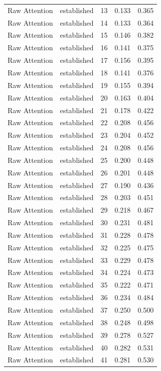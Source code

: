 \begin{tabular}{llrrr}
Raw Attention & established & 13 & 0.133 & 0.365 \\
Raw Attention & established & 14 & 0.133 & 0.364 \\
Raw Attention & established & 15 & 0.146 & 0.382 \\
Raw Attention & established & 16 & 0.141 & 0.375 \\
Raw Attention & established & 17 & 0.156 & 0.395 \\
Raw Attention & established & 18 & 0.141 & 0.376 \\
Raw Attention & established & 19 & 0.155 & 0.394 \\
Raw Attention & established & 20 & 0.163 & 0.404 \\
Raw Attention & established & 21 & 0.178 & 0.422 \\
Raw Attention & established & 22 & 0.208 & 0.456 \\
Raw Attention & established & 23 & 0.204 & 0.452 \\
Raw Attention & established & 24 & 0.208 & 0.456 \\
Raw Attention & established & 25 & 0.200 & 0.448 \\
Raw Attention & established & 26 & 0.201 & 0.448 \\
Raw Attention & established & 27 & 0.190 & 0.436 \\
Raw Attention & established & 28 & 0.203 & 0.451 \\
Raw Attention & established & 29 & 0.218 & 0.467 \\
Raw Attention & established & 30 & 0.231 & 0.481 \\
Raw Attention & established & 31 & 0.228 & 0.478 \\
Raw Attention & established & 32 & 0.225 & 0.475 \\
Raw Attention & established & 33 & 0.229 & 0.478 \\
Raw Attention & established & 34 & 0.224 & 0.473 \\
Raw Attention & established & 35 & 0.222 & 0.471 \\
Raw Attention & established & 36 & 0.234 & 0.484 \\
Raw Attention & established & 37 & 0.250 & 0.500 \\
Raw Attention & established & 38 & 0.248 & 0.498 \\
Raw Attention & established & 39 & 0.278 & 0.527 \\
Raw Attention & established & 40 & 0.282 & 0.531 \\
Raw Attention & established & 41 & 0.281 & 0.530 \\

\end{tabular}
